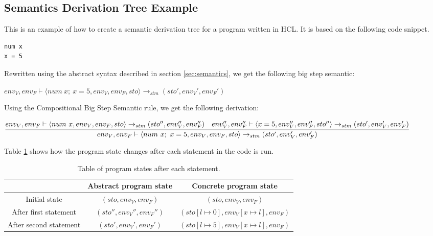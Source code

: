 \begin{landscape}
\section{Semantics Derivation Tree Example}
\label{sec:semanticsTree}
This is an example of how to create a semantic derivation tree for a program written in HCL.
It is based on the following code snippet.

\begin{lstlisting}[language=HCL,label=lis:derivationCode,firstnumber=1]
num x
x = 5
\end{lstlisting}

Rewritten using the abstract syntax described in section \ref{sec:semantics}, we get the following big step semantic:

\begin{center}
	$env_V, env_F \vdash \langle num\ x;\ x = 5, env_V, env_F, sto \rangle \rightarrow_{stm} (sto', env_V', env_F')$
\end{center}
Using the Compositional Big Step Semantic rule, we get the following derivation:

\begin{center}
	\begin{math}
		\cfrac
		{env_V, env_F \vdash \langle num\ x, env_V, env_F, sto \rangle \rightarrow_{stm} (sto'', env_V'', env_F'')\quad env_V'', env_F'' \vdash \langle x = 5, env_V'', env_F'', sto'' \rangle \rightarrow_{stm} (sto', env_V', env_F')}
		{env_V, env_F \vdash \langle num\ x;\ x = 5, env_V, env_F, sto \rangle \rightarrow_{stm} (sto', env_V', env_F')}
	\end{math}
\end{center}

Table \ref{tbl:progstates} shows how the program state changes after each statement in the code is run.

\begin{table}[H]
	\centering
	\caption{Table of program states after each statement.}
	\label{tbl:progstates}
	\setlength\extrarowheight{5pt}
	\begin{tabular}{|c|c|c|}
		\hline
		& Abstract program state      & Concrete program state                          \\ \hline
		Initial state          & $(sto, env_V, env_F)$       & $(sto, env_V, env_F)$                           \\ \hline
		After first statement  & $(sto'', env_V'', env_F'')$ & $(sto[l \mapsto 0], env_V[x \mapsto l], env_F)$ \\ \hline
		After second statement & $(sto', env_V', env_F')$    & $(sto[l \mapsto 5], env_V[x \mapsto l], env_F)$  \\ \hline
	\end{tabular}
\end{table}

\end{landscape}